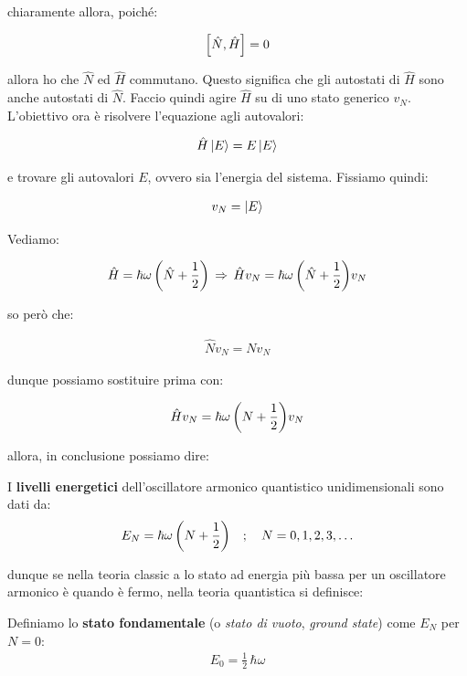 	chiaramente allora, poiché: 

\begin{align*}
	\qty[\hat{N}, \hat{H}] = 0
\end{align*}

	allora ho che $\hat{N}$ ed $\hat{H}$ commutano. Questo significa che gli autostati di $\hat{H}$ sono anche autostati di $\hat{N}$. Faccio quindi agire $\hat{H}$ su di uno stato generico $v_N$. L'obiettivo ora è risolvere l'equazione agli autovalori:
	
\begin{align*}
	\hat{H} \ket{E} = E \ket{E}
\end{align*}

	e trovare gli autovalori $E$, ovvero sia l'energia del sistema. Fissiamo quindi:
	
\begin{align*}
	v_N = \ket{E}
\end{align*}
 
	Vediamo:
	
\begin{align*}
	\hat{H} = \hbar \omega \, \qty(\hat{N} + \frac{1}{2}) \, \Rightarrow \, \hat{H} v_N = \hbar \omega \, \qty(\hat{N} + \frac{1}{2})v_N 
\end{align*}

	so però che:
	
\begin{align*}
	\hat{N} v_N = Nv_N
\end{align*}

	dunque possiamo sostituire prima con:

\begin{align*}
	\hat{H} v_N = \hbar \omega \, \qty(N + \frac{1}{2})v_N 
\end{align*}

	allora, in conclusione possiamo dire:
	
\begin{mydef}
	I \textbf{livelli energetici} dell'oscillatore armonico quantistico unidimensionali sono dati da:
\begin{align*}
	E_N = \hbar \omega \, \qty(N + \frac{1}{2}) \quad ; \quad N = 0, 1, 2, 3, \ldots
\end{align*}
\end{mydef}

	dunque se nella teoria classic a lo stato ad energia più bassa per un oscillatore armonico è quando è fermo, nella teoria quantistica si definisce:
	
\begin{mydef}
	Definiamo lo \textbf{stato fondamentale} (o \textit{stato di vuoto}, \textit{ground state}) come $E_N$ per $N = 0$:
\begin{align*}
	E_0 = \frac{1}{2}\, \hbar \omega
\end{align*}
\end{mydef}


